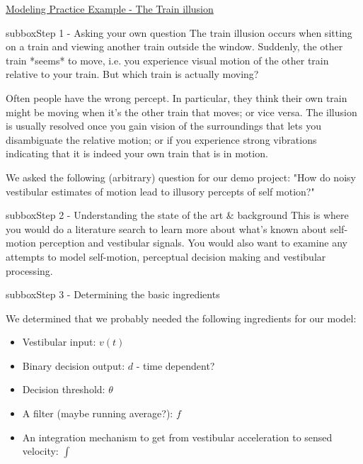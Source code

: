 \begin{textbox}{\href{https://compneuro.neuromatch.io/projects/modelingsteps/ModelingSteps_5through10.html}{Modeling Practice Example - The Train illusion} }
\begin{subbox}{subbox}{Step 1 - Asking your own question}
\scriptsize
The train illusion occurs when sitting on a train and viewing another train outside the window. Suddenly, the other train *seems* to move, i.e. you experience visual motion of the other train relative to your train. But which train is actually moving?

Often people have the wrong percept. In particular, they think their own train might be moving when it's the other train that moves; or vice versa. The illusion is usually resolved once you gain vision of the surroundings that lets you disambiguate the relative motion; or if you experience strong vibrations indicating that it is indeed your own train that is in motion.


We asked the following (arbitrary) question for our demo project: "How do noisy vestibular estimates of motion lead to illusory percepts of self motion?"



\end{subbox}
\begin{subbox}{subbox}{Step 2  - Understanding the state of the art \& background}
\scriptsize
 This is where you would do a literature search to learn more about what's known about self-motion perception and vestibular signals. You would also want to examine any attempts to model self-motion, perceptual decision making and vestibular processing.

\end{subbox}
\begin{subbox}{subbox}{Step 3 - Determining the basic ingredients  }
\scriptsize

We determined that we probably needed the following ingredients for our model:
\begin{itemize}
    \item 
 Vestibular input: $v(t)$
\item
 Binary decision output: $d$ - time dependent?
\item
 Decision threshold: $\theta$
\item
 A filter (maybe running average?): $f$
\item
 An integration mechanism to get from vestibular acceleration to sensed velocity: $\int$
 \end{itemize}


\end{subbox}
\end{textbox}
